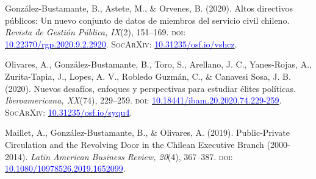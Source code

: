 \begin{publications}
\begin{benumerate}{10}
\item{González-Bustamante, B., Astete, M., \& Orvenes, B. (2020). Altos directivos públicos: Un nuevo conjunto de datos de miembros del servicio civil chileno. {\itshape Revista de Gestión Pública, IX}(2), 151--169. {\scshape doi}: \\ \href{https://doi.org/10.22370/rgp.2020.9.2.2920}{\textcolor{blue}{10.22370/rgp.2020.9.2.2920}}. {\scshape \footnotesize SocArXiv:} \href{https://doi.org/10.31235/osf.io/vshcz}{\textcolor{blue}{10.31235/osf.io/vshcz}}.}\vspace{1mm}


\item{ Olivares, A., González-Bustamante, B., Toro, S., Arellano, J. C., Yanes-Rojas, A., Zurita-Tapia, J., Lopes, A. V., Robledo Guzmán, C., \& Canavesi Sosa, J. B. (2020). Nuevos desafíos, enfoques y perspectivas para estudiar élites políticas. {\itshape Iberoamericana, XX}(74), 229--259. {\scshape doi}: \href{https://doi.org/10.18441/ibam.20.2020.74.229-259}{\textcolor{blue}{10.18441/ibam.20.2020.74.229-259}}. {\scshape \footnotesize SocArXiv:} \href{https://doi.org/10.31235/osf.io/syqu4}{\textcolor{blue}{10.31235/osf.io/syqu4}}.}\vspace{1mm}

\item{Maillet, A., González-Bustamante, B., \& Olivares, A. (2019). Public-Private Circulation and the Revolving Door in the Chilean Executive Branch (2000-2014). {\itshape Latin American Business Review, 20}(4), 367--387. {\scshape doi:} \href{https://doi.org/10.1080/10978526.2019.1652099}{\textcolor{blue}{10.1080/10978526.2019.1652099}}.}\vspace{1mm}



\end{benumerate}
\end{publications}
